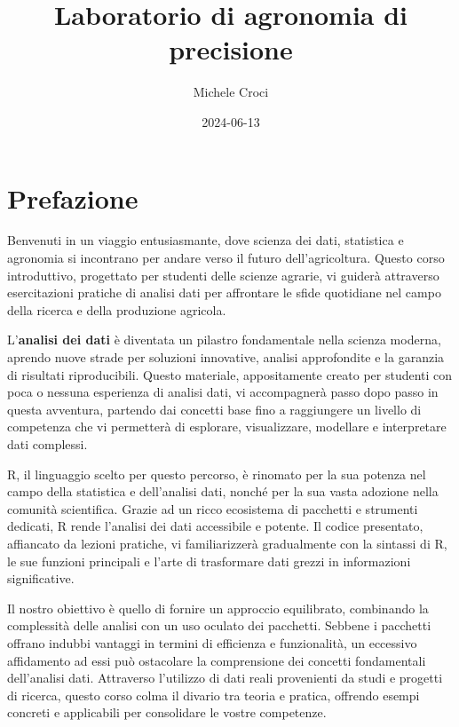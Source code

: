 \documentclass[
]{book}
\title{Laboratorio di agronomia di precisione}
\author{Michele Croci}
\date{2024-06-13}
\theoremstyle{definition}
\theoremstyle{definition}
\theoremstyle{definition}
\theoremstyle{definition}
\theoremstyle{remark}
\begin{document}
\maketitle

{
\setcounter{tocdepth}{1}
\tableofcontents
}
\hypertarget{prefazione}{%
\chapter{Prefazione}\label{prefazione}}

Benvenuti in un viaggio entusiasmante, dove scienza dei dati, statistica e agronomia si incontrano per andare verso il futuro dell'agricoltura. Questo corso introduttivo, progettato per studenti delle scienze agrarie, vi guiderà attraverso esercitazioni pratiche di analisi dati per affrontare le sfide quotidiane nel campo della ricerca e della produzione agricola.

L'\textbf{analisi dei dati} è diventata un pilastro fondamentale nella scienza moderna, aprendo nuove strade per soluzioni innovative, analisi approfondite e la garanzia di risultati riproducibili. Questo materiale, appositamente creato per studenti con poca o nessuna esperienza di analisi dati, vi accompagnerà passo dopo passo in questa avventura, partendo dai concetti base fino a raggiungere un livello di competenza che vi permetterà di esplorare, visualizzare, modellare e interpretare dati complessi.

R, il linguaggio scelto per questo percorso, è rinomato per la sua potenza nel campo della statistica e dell'analisi dati, nonché per la sua vasta adozione nella comunità scientifica. Grazie ad un ricco ecosistema di pacchetti e strumenti dedicati, R rende l'analisi dei dati accessibile e potente. Il codice presentato, affiancato da lezioni pratiche, vi familiarizzerà gradualmente con la sintassi di R, le sue funzioni principali e l'arte di trasformare dati grezzi in informazioni significative.

Il nostro obiettivo è quello di fornire un approccio equilibrato, combinando la complessità delle analisi con un uso oculato dei pacchetti. Sebbene i pacchetti offrano indubbi vantaggi in termini di efficienza e funzionalità, un eccessivo affidamento ad essi può ostacolare la comprensione dei concetti fondamentali dell'analisi dati. Attraverso l'utilizzo di dati reali provenienti da studi e progetti di ricerca, questo corso colma il divario tra teoria e pratica, offrendo esempi concreti e applicabili per consolidare le vostre competenze.
\end{document}
